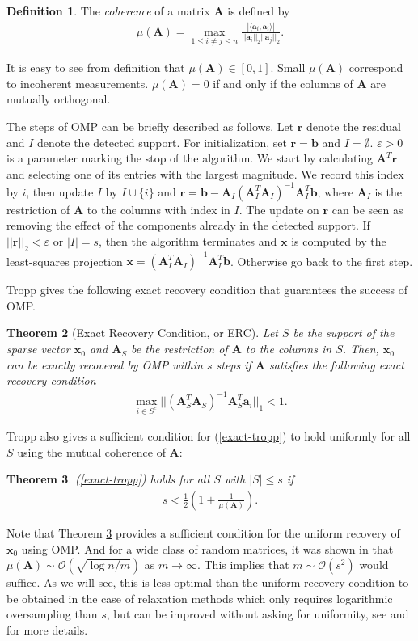 \documentclass[11pt]{article}
\numberwithin{equation}{section}
\theoremstyle{plain}
\newtheorem{Th}{Theorem}[section]
\theoremstyle{definition}
\newtheorem{Def}[Th]{Definition}
\def\A{{\mathbf A}}
\def\x{{\mathbf x}}
\def\b{{\mathbf b}}
\def\a{{\mathbf a}}
\def\e{{\varepsilon}}
\begin{document}
\begin{Def}
The \emph{coherence} of a matrix $\A$ is defined by
\begin{align*}
\mu(\A)=\max_{1\leq i\neq j\leq n}\frac{|\langle\a_i, \a_i\rangle|}{||\a_i||_2||\a_j||_2}. 
\end{align*} 
\end{Def}

It is easy to see from definition that $\mu(\A)\in [0, 1]$. Small $\mu(\A)$ correspond to incoherent measurements. $\mu(\A)=0$ if and only if the columns of $\A$ are mutually orthogonal.

The steps of OMP can be briefly described as follows. Let $\mathbf{r}$ denote the residual and $I$ denote the detected support. For initialization, set $\mathbf{r}=\b$ and $I=\emptyset$. $\e>0$ is a parameter marking the stop of the algorithm. We start by calculating $\A^T\mathbf{r}$ and selecting one of its entries with the largest magnitude. We record this index by $i$, then update $I$ by $I\cup\{i\}$ and $\mathbf{r}=\b-\A_I(\A_I^T \A_I)^{-1}\A_I^T \b$, where $\A_I$ is the restriction of $\A$ to the columns with index in $I$. The update on $\mathbf{r}$ can be seen as removing the effect of the components already in the detected support. If $||\mathbf{r}||_2<\e$ or $|I|=s$, then the algorithm terminates and $\x$ is computed by the least-squares projection $\x=(\A_I^T \A_I)^{-1}\A_I^T \b$. Otherwise go back to the first step. 

Tropp gives the following exact recovery condition that guarantees the success of OMP. 

\begin{Th}[Exact Recovery Condition, or ERC]
Let $S$ be the support of the sparse vector $\x_0$ and $\A_S$ be the restriction of $\A$ to the columns in $S$. Then, $\x_0$ can be exactly recovered by OMP within $s$ steps if $\A$ satisfies the following exact recovery condition
\begin{align}
\max_{i\in S^c}||(\A^T_S\A_S)^{-1}\A^T_S\a_i||_1<1.\label{exact-tropp}
\end{align} 
\end{Th}

Tropp also gives a sufficient condition for (\ref{exact-tropp}) to hold uniformly for all $S$ using the mutual coherence of $\A$:

\begin{Th}\label{unif-OMP}
(\ref{exact-tropp}) holds for all $S$ with $|S|\leq s$ if 
\begin{align*}
s<\frac{1}{2}\left(1+\frac{1}{\mu(\A)}\right).
\end{align*} 
\end{Th}
Note that Theorem \ref{unif-OMP} provides a sufficient condition for the uniform recovery of $\x_0$ using OMP. And for a wide class of random matrices, it was shown in \cite{cai2011limiting} that $\mu(\A)\sim\mathcal{O}(\sqrt{\log n/m})$ as $m\rightarrow\infty$. This implies that $m\sim\mathcal{O}(s^2)$ would suffice. As we will see, this is less optimal than the uniform recovery condition to be obtained in the case of relaxation methods which only requires logarithmic oversampling than $s$, but can be improved without asking for uniformity, see \cite{tropp2007signal} and \cite{cohen2009compressed} for more details. 
\end{document}
